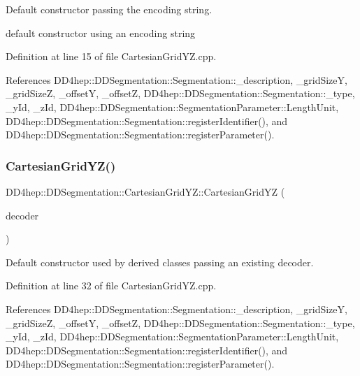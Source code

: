 Default constructor passing the encoding string. 

default constructor using an encoding string 

Definition at line 15 of file Cartesian\+Grid\+Y\+Z.\+cpp.



References D\+D4hep\+::\+D\+D\+Segmentation\+::\+Segmentation\+::\+\_\+description, \+\_\+grid\+SizeY, \+\_\+grid\+SizeZ, \+\_\+offsetY, \+\_\+offsetZ, D\+D4hep\+::\+D\+D\+Segmentation\+::\+Segmentation\+::\+\_\+type, \+\_\+y\+Id, \+\_\+z\+Id, D\+D4hep\+::\+D\+D\+Segmentation\+::\+Segmentation\+Parameter\+::\+Length\+Unit, D\+D4hep\+::\+D\+D\+Segmentation\+::\+Segmentation\+::register\+Identifier(), and D\+D4hep\+::\+D\+D\+Segmentation\+::\+Segmentation\+::register\+Parameter().

\hypertarget{class_d_d4hep_1_1_d_d_segmentation_1_1_cartesian_grid_y_z_a9f4c387d36c1ce52d40f7eb85618c6fd}{}\label{class_d_d4hep_1_1_d_d_segmentation_1_1_cartesian_grid_y_z_a9f4c387d36c1ce52d40f7eb85618c6fd} 
\subsubsection{\texorpdfstring{Cartesian\+Grid\+Y\+Z()}{CartesianGridYZ()}\hspace{0.1cm}{\footnotesize\ttfamily [2/2]}}
{\footnotesize\ttfamily D\+D4hep\+::\+D\+D\+Segmentation\+::\+Cartesian\+Grid\+Y\+Z\+::\+Cartesian\+Grid\+YZ (\begin{DoxyParamCaption}\item[{\hyperlink{class_d_d4hep_1_1_d_d_segmentation_1_1_bit_field64}{Bit\+Field64} $\ast$}]{decoder }\end{DoxyParamCaption})}



Default constructor used by derived classes passing an existing decoder. 



Definition at line 32 of file Cartesian\+Grid\+Y\+Z.\+cpp.



References D\+D4hep\+::\+D\+D\+Segmentation\+::\+Segmentation\+::\+\_\+description, \+\_\+grid\+SizeY, \+\_\+grid\+SizeZ, \+\_\+offsetY, \+\_\+offsetZ, D\+D4hep\+::\+D\+D\+Segmentation\+::\+Segmentation\+::\+\_\+type, \+\_\+y\+Id, \+\_\+z\+Id, D\+D4hep\+::\+D\+D\+Segmentation\+::\+Segmentation\+Parameter\+::\+Length\+Unit, D\+D4hep\+::\+D\+D\+Segmentation\+::\+Segmentation\+::register\+Identifier(), and D\+D4hep\+::\+D\+D\+Segmentation\+::\+Segmentation\+::register\+Parameter().

